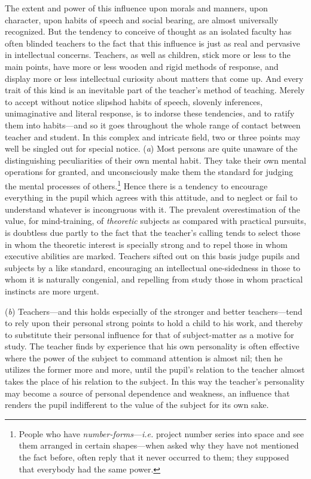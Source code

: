 \documentclass[letterpaper]{book}
\begin{document}
The extent and power of this influence upon morals and manners, upon
character, upon habits of speech and social bearing, are almost
universally recognized. But the tendency to conceive of thought as an
isolated faculty has often blinded teachers to the fact that this
influence is just as real and pervasive in intellectual concerns.
Teachers, as well as children, stick more or less to the main points,
have more or less wooden and rigid methods of response, and display more
or less intellectual curiosity about matters that come up. And every
trait of this kind is an inevitable part of the teacher's method of
teaching. Merely to accept without notice slipshod habits of speech,
slovenly inferences, unimaginative and literal response, is to indorse
these tendencies, and to ratify them into habits---and so it goes
throughout the whole range of contact between teacher and student. In
this complex and intricate field, two or three points may well be
singled out for special notice. (\emph{a}) Most persons are quite
unaware of the distinguishing peculiarities of their own mental habit.
They take their own mental operations for granted, and unconsciously
make them the standard for judging the mental processes of
others.\footnote{
People who have \emph{number-forms}---\emph{i.e.} project number series
into space and see them arranged in certain shapes---when asked why they
have not mentioned the fact before, often reply that it never occurred
to them; they supposed that everybody had the same power.
}
Hence
there
is a tendency to encourage everything in the pupil which agrees with
this attitude, and to neglect or fail to understand whatever is
incongruous with it. The prevalent overestimation of the value, for
mind-training, of \emph{theoretic} subjects as compared with practical
pursuits, is doubtless due partly to the fact that the teacher's calling
tends to select those in whom the theoretic interest is specially strong
and to repel those in whom executive abilities are marked. Teachers
sifted out on this basis judge pupils and subjects by a like standard,
encouraging an intellectual one-sidedness in those to whom it is
naturally congenial, and repelling from study those in whom practical
instincts are more urgent.


(\emph{b}) Teachers---and this holds especially of the stronger and
better teachers---tend to rely upon their personal strong points to hold
a child to his work, and thereby to substitute their personal influence
for that of subject-matter as a motive for study. The teacher finds by
experience that his own personality is often effective where the power
of the subject to command attention is almost nil; then he utilizes the
former more and more, until the pupil's relation to the teacher almost
takes the place of his relation to the subject. In this way the
teacher's personality may become a source of personal dependence and
weakness, an influence that renders the pupil indifferent to the value
of the subject for its own sake.
\end{document}
